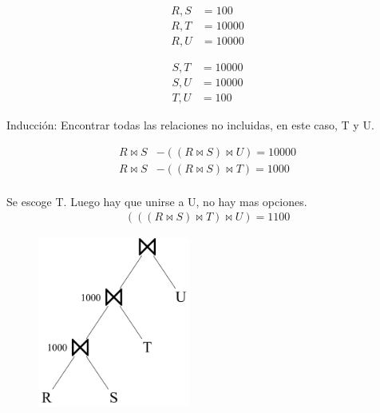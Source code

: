 \documentclass{templateNote}
\begin{document}
\begin{enumerate}
\begin{enumerate}[label=\alph*)]
            \noindent %
            \begin{center}
            \begin{minipage}{0.3\textwidth}
            \begin{align}
                {R,S} &= 100 \\
                {R,T} &= 10000 \nonumber \\
                {R,U} &= 10000 \nonumber 
            \end{align}
            \end{minipage}%
            \begin{minipage}{0.3\textwidth}
            \begin{align}
                {S,T} &= 10000 \nonumber \\
                {S,U} &= 10000 \nonumber \\  
                {T,U} &= 100 
            \end{align}
            \end{minipage}   
            \end{center}

            \vspace{0.5cm}
            \noindent Inducción: Encontrar todas las relaciones no incluidas, en este caso, T y U.

            \begin{align*}
                R \Join S &- ((R \Join S) \Join U) = 10000 \\
                R \Join S &- ((R \Join S) \Join T) = 1000 \\
            \end{align*}
            
            Se escoge T. Luego hay que unirse a U, no hay mas opciones.
            \begin{align*}
                (((R \Join S)\Join T)\Join U) = 1100
            \end{align*}

            \begin{figure}[H]
                \centering
                \includegraphics[width=5cm]{img/img3.png}
            \end{figure}

        \end{enumerate}

\end{enumerate}
\end{document}
